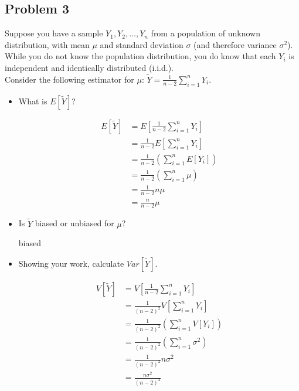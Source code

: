 \documentclass[10pt]{article}
\begin{document}
 \subsection*{Problem 3}

 Suppose you have a sample $Y_1, Y_2, \ldots, Y_n$ from a population of unknown distribution, with mean $\mu$ and standard deviation $\sigma$ (and therefore variance $\sigma^2$).  While you do not know the population distribution, you do know that each $Y_i$ is independent and identically distributed (i.i.d.).  \\

 Consider the following estimator for $\mu$: $\tilde{Y} = \frac{1}{n-2} \sum_{i=1}^n Y_i$.

 \begin{itemize}
 \item[a)] What is $E[\tilde{Y}]$?

 \color{red}
 \begin{align*}
 E[\tilde{Y}] &= E[ \frac{1}{n-2} \displaystyle \sum_{i=1}^n Y_i] \\
 &= \frac{1}{n-2} E[ \sum_{i=1}^n Y_i]\\
 &= \frac{1}{n-2} (\sum_{i=1}^n E[Y_i])\\
 &=\frac{1}{n-2} (\sum_{i=1}^n \mu )\\
 &=\frac{1}{n-2} n\mu \\
 &= \frac{n}{n-2}\mu
 \end{align*}
 \color{black}


\item[b)] Is $\tilde{Y}$ biased or unbiased for $\mu$?

\color{red} biased \color{black}



%

 \item[c)] Showing your work, calculate $Var[\tilde{Y}]$.

 \color{red}
 \begin{align*}
 V[\tilde{Y}] &= V[ \frac{1}{n-2} \displaystyle \sum_{i=1}^n Y_i] \\
 &= \frac{1}{(n-2)^2} V[ \sum_{i=1}^n Y_i]\\
 &= \frac{1}{(n-2)^2} (\sum_{i=1}^n V[Y_i])\\
 &=\frac{1}{(n-2)^2} (\sum_{i=1}^n \sigma^2 )\\
 &=\frac{1}{(n-2)^2} n\sigma^2 \\
 &= \frac{n\sigma^2}{(n-2)^2}
 \end{align*}
 \color{black}



\end{itemize}
\end{document}
